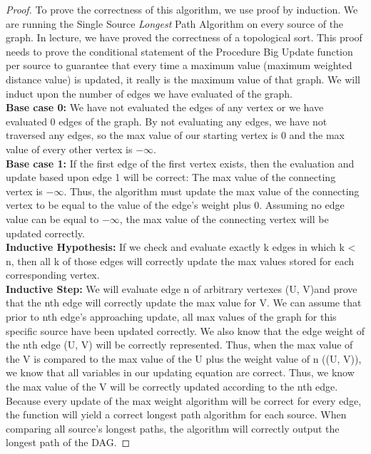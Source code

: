 \documentclass[11pt, solution, letterpaper]{format}
\begin{document}
\begin{proof}To prove the correctness of this algorithm, we use proof by induction. We are running the Single Source \emph{Longest} Path Algorithm on every source of the graph. In lecture, we have proved the correctness of a topological sort. This proof needs to prove the conditional statement of the Procedure Big Update function per source to guarantee that every time a maximum value (maximum weighted distance value) is updated, it really is the maximum  value of that graph. We will induct upon the number of edges we have evaluated of the graph. \\


\textbf{Base case 0:} We have not evaluated the edges of any vertex or we have evaluated 0 edges of the graph. By not evaluating any edges, we have not traversed any edges, so the max value of our starting vertex is 0 and the max value of every other vertex is $-\infty$.\\

\textbf{Base case 1:} If the first edge of the first vertex exists, then the evaluation and update based upon edge 1 will be correct: The max value of the connecting vertex is $-\infty$. Thus, the algorithm must update the max value of the connecting vertex to be equal to the value of the edge's weight plus 0. Assuming no edge value can be equal to $-\infty$, the max value of the connecting vertex will be updated correctly. \\

\textbf{Inductive Hypothesis:} If we check and evaluate exactly k edges in which k < n, then all k of those edges will correctly update the max values stored for each corresponding vertex. \\

\textbf{Inductive Step:} We will evaluate edge n of arbitrary vertexes (U, V)and prove that the nth edge will correctly update the max value for V. We can assume that prior to nth edge's approaching update, all max values of the graph for this specific source have been updated correctly. We also know that the edge weight of the nth edge (U, V) will be correctly represented. Thus, when the max value of the V is compared to the max value of the U plus the weight value of n ((U, V)), we know that all variables in our updating equation are correct. Thus, we know the max value of the V will be correctly updated according to the nth edge. \\

Because every update of the max weight algorithm will be correct for every edge, the function will yield a correct longest path algorithm for each source. When comparing all source's longest paths, the algorithm will correctly output the longest path of the DAG. \end{proof}
\end{document}
